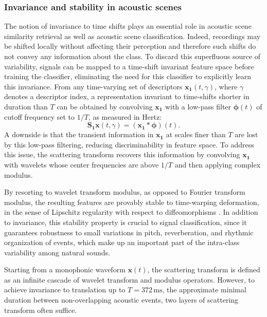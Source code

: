 \subsubsection{Invariance and stability in acoustic scenes}
The notion of invariance to time shifts plays an essential role in acoustic scene similarity retrieval as well as acoustic scene classification.
Indeed, recordings may be shifted locally without affecting their perception and therefore such shifts do not convey any information about the class.
To discard this superfluous source of variability, signals can be mapped to a time-shift invariant feature space before training the classifier, eliminating the need for this classifier to explicitly learn this invariance.
From any time-varying set of descriptors $\boldsymbol{x_1}(t,\gamma)$, where $\gamma$ denotes a descriptor index, a representation invariant to time-shifts shorter in duration than $T$ can be obtained by convolving $\boldsymbol{x_1}$ with a low-pass filter $\boldsymbol{\phi}(t)$ of cutoff frequency set to $1/T$, as measured in Hertz:
\begin{equation}
\mathbf{S_1}\boldsymbol{x}(t, \gamma) = (\boldsymbol{x_1} \ast \boldsymbol{\phi}) (t).
\end{equation}
A downside is that the transient information in $\boldsymbol{x_1}$ at scales finer than $T$ are lost by this low-pass filtering, reducing discriminability in feature space.
To address this issue, the scattering transform recovers this information by convolving $\boldsymbol{x_1}$ with wavelets whose center frequencies are above $1/T$ and then applying complex modulus.

By resorting to wavelet transform modulus, as opposed to Fourier transform modulus, the resulting features are provably stable to time-warping deformation,
in the sense of Lipschitz regularity with respect to diffeomorphisms \cite{Mallat2012}.
In addition to invariance, this stability property is crucial to signal classification, since it guarantees robustness to small variations in pitch, reverberation, and rhythmic organization of events, which make up an important part of the intra-class variability among natural sounds.

Starting from a monophonic waveform $\boldsymbol{x}(t)$, the scattering transform is defined as an infinite cascade of wavelet transform and modulus operators.
However, to achieve invariance to translation up to $T = 372\,\mathrm{ms}$, \ie the approximate minimal duration between non-overlapping acoustic events, two layers of scattering transform often suffice.

